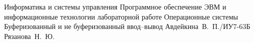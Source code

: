 \makereporttitle
{Информатика и системы управления} %
{Программное обеспечение ЭВМ и информационные технологии} %
{лабораторной работе} %
{Операционные системы} %
{Буферизованный и не буферизованный ввод--вывод} %
{} %
{Авдейкина~В.~П./ИУ7-63Б} %
{Рязанова~Н.~Ю.} %